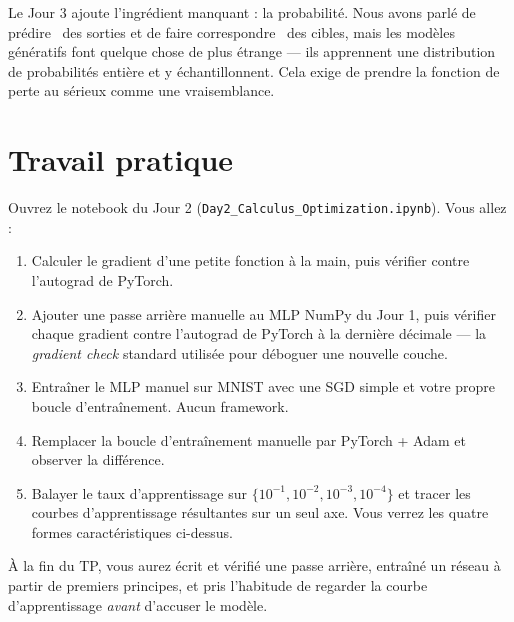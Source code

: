 Le Jour 3 ajoute l'ingrédient manquant : la probabilité. Nous avons parlé de \og prédire \fg\ des sorties et de \og faire correspondre \fg\ des cibles, mais les modèles génératifs font quelque chose de plus étrange --- ils apprennent une distribution de probabilités entière et y échantillonnent. Cela exige de prendre la fonction de perte au sérieux comme une vraisemblance.

\section*{Travail pratique}

Ouvrez le notebook du Jour 2 (\texttt{Day2\_Calculus\_Optimization.ipynb}). Vous allez :

\begin{enumerate}
  \item Calculer le gradient d'une petite fonction à la main, puis vérifier contre l'autograd de PyTorch.
  \item Ajouter une passe arrière manuelle au MLP NumPy du Jour 1, puis vérifier chaque gradient contre l'autograd de PyTorch à la dernière décimale --- la \emph{gradient check} standard utilisée pour déboguer une nouvelle couche.
  \item Entraîner le MLP manuel sur MNIST avec une SGD simple et votre propre boucle d'entraînement. Aucun framework.
  \item Remplacer la boucle d'entraînement manuelle par PyTorch + Adam et observer la différence.
  \item Balayer le taux d'apprentissage sur $\{10^{-1}, 10^{-2}, 10^{-3}, 10^{-4}\}$ et tracer les courbes d'apprentissage résultantes sur un seul axe. Vous verrez les quatre formes caractéristiques ci-dessus.
\end{enumerate}

À la fin du TP, vous aurez écrit et vérifié une passe arrière, entraîné un réseau à partir de premiers principes, et pris l'habitude de regarder la courbe d'apprentissage \emph{avant} d'accuser le modèle.
